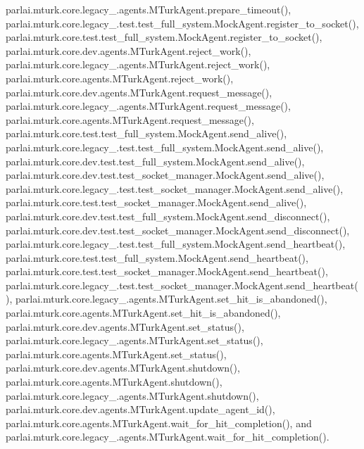 parlai.\+mturk.\+core.\+legacy\+\_.\+agents.\+M\+Turk\+Agent.\+prepare\+\_\+timeout(), parlai.\+mturk.\+core.\+legacy\+\_.\+test.\+test\+\_\+full\+\_\+system.\+Mock\+Agent.\+register\+\_\+to\+\_\+socket(), parlai.\+mturk.\+core.\+test.\+test\+\_\+full\+\_\+system.\+Mock\+Agent.\+register\+\_\+to\+\_\+socket(), parlai.\+mturk.\+core.\+dev.\+agents.\+M\+Turk\+Agent.\+reject\+\_\+work(), parlai.\+mturk.\+core.\+legacy\+\_.\+agents.\+M\+Turk\+Agent.\+reject\+\_\+work(), parlai.\+mturk.\+core.\+agents.\+M\+Turk\+Agent.\+reject\+\_\+work(), parlai.\+mturk.\+core.\+dev.\+agents.\+M\+Turk\+Agent.\+request\+\_\+message(), parlai.\+mturk.\+core.\+legacy\+\_.\+agents.\+M\+Turk\+Agent.\+request\+\_\+message(), parlai.\+mturk.\+core.\+agents.\+M\+Turk\+Agent.\+request\+\_\+message(), parlai.\+mturk.\+core.\+test.\+test\+\_\+full\+\_\+system.\+Mock\+Agent.\+send\+\_\+alive(), parlai.\+mturk.\+core.\+legacy\+\_.\+test.\+test\+\_\+full\+\_\+system.\+Mock\+Agent.\+send\+\_\+alive(), parlai.\+mturk.\+core.\+dev.\+test.\+test\+\_\+full\+\_\+system.\+Mock\+Agent.\+send\+\_\+alive(), parlai.\+mturk.\+core.\+dev.\+test.\+test\+\_\+socket\+\_\+manager.\+Mock\+Agent.\+send\+\_\+alive(), parlai.\+mturk.\+core.\+legacy\+\_.\+test.\+test\+\_\+socket\+\_\+manager.\+Mock\+Agent.\+send\+\_\+alive(), parlai.\+mturk.\+core.\+test.\+test\+\_\+socket\+\_\+manager.\+Mock\+Agent.\+send\+\_\+alive(), parlai.\+mturk.\+core.\+dev.\+test.\+test\+\_\+full\+\_\+system.\+Mock\+Agent.\+send\+\_\+disconnect(), parlai.\+mturk.\+core.\+dev.\+test.\+test\+\_\+socket\+\_\+manager.\+Mock\+Agent.\+send\+\_\+disconnect(), parlai.\+mturk.\+core.\+legacy\+\_.\+test.\+test\+\_\+full\+\_\+system.\+Mock\+Agent.\+send\+\_\+heartbeat(), parlai.\+mturk.\+core.\+test.\+test\+\_\+full\+\_\+system.\+Mock\+Agent.\+send\+\_\+heartbeat(), parlai.\+mturk.\+core.\+test.\+test\+\_\+socket\+\_\+manager.\+Mock\+Agent.\+send\+\_\+heartbeat(), parlai.\+mturk.\+core.\+legacy\+\_.\+test.\+test\+\_\+socket\+\_\+manager.\+Mock\+Agent.\+send\+\_\+heartbeat(), parlai.\+mturk.\+core.\+legacy\+\_.\+agents.\+M\+Turk\+Agent.\+set\+\_\+hit\+\_\+is\+\_\+abandoned(), parlai.\+mturk.\+core.\+agents.\+M\+Turk\+Agent.\+set\+\_\+hit\+\_\+is\+\_\+abandoned(), parlai.\+mturk.\+core.\+dev.\+agents.\+M\+Turk\+Agent.\+set\+\_\+status(), parlai.\+mturk.\+core.\+legacy\+\_.\+agents.\+M\+Turk\+Agent.\+set\+\_\+status(), parlai.\+mturk.\+core.\+agents.\+M\+Turk\+Agent.\+set\+\_\+status(), parlai.\+mturk.\+core.\+dev.\+agents.\+M\+Turk\+Agent.\+shutdown(), parlai.\+mturk.\+core.\+agents.\+M\+Turk\+Agent.\+shutdown(), parlai.\+mturk.\+core.\+legacy\+\_.\+agents.\+M\+Turk\+Agent.\+shutdown(), parlai.\+mturk.\+core.\+dev.\+agents.\+M\+Turk\+Agent.\+update\+\_\+agent\+\_\+id(), parlai.\+mturk.\+core.\+agents.\+M\+Turk\+Agent.\+wait\+\_\+for\+\_\+hit\+\_\+completion(), and parlai.\+mturk.\+core.\+legacy\+\_.\+agents.\+M\+Turk\+Agent.\+wait\+\_\+for\+\_\+hit\+\_\+completion().

